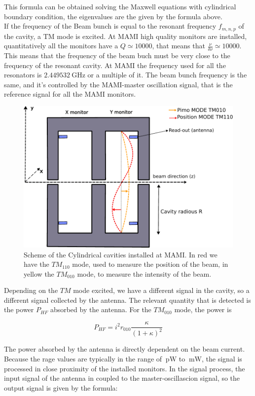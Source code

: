 This formula can be obtained solving the Maxwell equations with cylindrical boundary condition, the eigenvalues are the given by the formula above. \\
If the frequency of the Beam bunch is equal to the resonant frequency $f_{m,n,p}$ of the cavity, a TM mode is excited. At MAMI high quality monitors are installed, quantitatively all the monitors have a $Q \simeq 10000$, that means that $\frac{\nu}{\delta \nu} \simeq 10000$. This means that the frequency of the beam buch must be very close to the frequency of the resonant cavity. At MAMI the frequency used for all the resonators is $\SI{2.449532}{\giga \hertz}$ or a multiple of it. The beam bunch frequency is the same, and it's controlled by the MAMI-master oscillation signal, that is the reference signal for all the MAMI monitors.

\begin{figure}[hbtp]
\centering
\includegraphics[width = 0.6 \textwidth]{ExperimentalSetup/Monitors.pdf}
\caption{Scheme of the Cylindrical cavities installed at MAMI. In red we have the $TM_{110}$ mode, used to measure the position of the beam, in yellow the $TM_{010}$ mode, to measure the intensity of the beam.}
\end{figure}

Depending on the $TM$ mode excited, we have a different signal in the cavity, so a different signal collected by the antenna. The relevant quantity that is detected is the power $P_{HF}$ absorbed by the antenna. For the $TM_{010}$ mode, the power is 

\begin{equation}
P_{HF} = i^{2} r_{010} \frac{\kappa}{(1 + \kappa)^{2}}
\end{equation}

The power absorbed by the antenna is directly dependent on the beam current. Because the rage values are typically in the range of $\SI{}{\pico \watt}$ to $\SI{}{\milli \watt }$, the signal is processed in close proximity of the installed monitors. In the signal process, the input signal of the antenna in coupled to the master-oscillascion signal, so the output signal is given by the formula:

